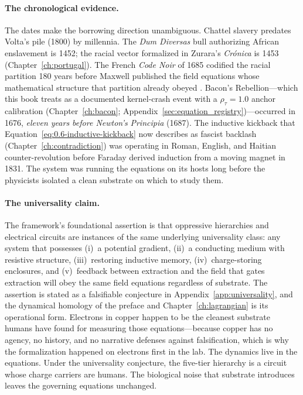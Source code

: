 \paragraph{The chronological evidence.}
The dates make the borrowing direction unambiguous. Chattel slavery
predates Volta's pile (1800) by millennia. The \textit{Dum Diversas}
bull authorizing African enslavement is 1452; the racial vector
formalized in Zurara's \textit{Cr\'onica} is 1453
(Chapter~\ref{ch:portugal}). The French \textit{Code Noir} of 1685
codified the racial partition 180 years before Maxwell published the
field equations whose mathematical structure that partition already
obeyed \cite{maxwell1865dynamical}. Bacon's Rebellion---which this book
treats as a documented kernel-crash event with a $\rho_\tau = 1.0$
anchor calibration (Chapter~\ref{ch:bacon};
Appendix~\ref{sec:equation_registry})---occurred in 1676,
\emph{eleven years before Newton's} \textit{Principia} (1687). The
inductive kickback that Equation~\eqref{eq:0.6-inductive-kickback} now
describes as fascist backlash (Chapter~\ref{ch:contradiction}) was
operating in Roman, English, and Haitian counter-revolution before
Faraday derived induction from a moving magnet in 1831. The system was
running the equations on its hosts long before the physicists isolated
a clean substrate on which to study them.

\paragraph{The universality claim.}
The framework's foundational assertion is that oppressive hierarchies
and electrical circuits are instances of the same underlying universality
class: any system that possesses (i)~a potential gradient, (ii)~a
conducting medium with resistive structure, (iii)~restoring inductive
memory, (iv)~charge-storing enclosures, and (v)~feedback between
extraction and the field that gates extraction will obey the same field
equations regardless of substrate. The assertion is stated as a falsifiable
conjecture in Appendix~\ref{app:universality}, and the dynamical homology
of the preface and Chapter~\ref{ch:lagrangian} is its operational form.
Electrons in copper happen to be the cleanest substrate humans have found
for measuring those equations---because copper has no agency, no history,
and no narrative defenses against falsification, which is why the
formalization happened on electrons first in the lab. The dynamics live
in the equations. Under the universality conjecture, the five-tier
hierarchy is a circuit whose charge carriers are humans. The biological
noise that substrate introduces leaves the governing equations unchanged.

